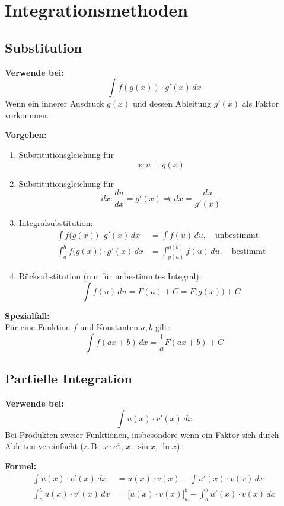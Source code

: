 \section{Integrationsmethoden}

\subsection{Substitution}
\textbf{Verwende bei:}
\[\int f(g(x))\cdot g'(x)\,dx\]
Wenn ein innerer Ausdruck \(g(x)\) und dessen Ableitung \(g'(x)\) als Faktor vorkommen.

\textbf{Vorgehen:}
\begin{enumerate}
    \item Substitutionsgleichung für
          \[
              x: u = g(x)
          \]
    \item Substitutionsgleichung für
          \[
              dx: \frac{du}{dx} = g'(x) \Rightarrow dx = \frac{du}{g'(x)}
          \]
    \item Integralsubstitution:
          \begin{align*}
              \int f\!\bigl(g(x)\bigr)\cdot g'(x)\,dx     & = \int f(u)\,du, \quad \text{unbestimmt}             \\
              \int_a^b f\!\bigl(g(x)\bigr)\cdot g'(x)\,dx & = \int_{g(a)}^{g(b)} f(u)\,du, \quad \text{bestimmt}
          \end{align*}
    \item  Rücksubstitution (nur für unbestimmtes Integral):
          \[
              \int f(u)\,du = F(u) + C = F\!\bigl(g(x)\bigr) + C
          \]

\end{enumerate}

\textbf{Spezialfall:}\\
Für eine Funktion \(f\) und Konstanten \(a, b\) gilt:
\[
    \int f(ax+b)\,dx = \frac{1}{a} F(ax+b) + C
\]

\subsection{Partielle Integration}
\textbf{Verwende bei:}
\[\int u(x)\cdot v'(x)\,dx\]
Bei Produkten zweier Funktionen, insbesondere wenn ein Faktor sich durch Ableiten vereinfacht (z.\,B.\ \(x\cdot e^x\), \(x\cdot\sin x\), \(\ln x\)).

\textbf{Formel:}
\begin{align*}
    \int u(x)\cdot v'(x)\,dx &= u(x)\cdot v(x) - \int u'(x)\cdot v(x)\,dx \\
    \int_a^b u(x)\cdot v'(x)\,dx &= \bigl[u(x)\cdot v(x)\bigr]_a^b - \int_a^b u'(x)\cdot v(x)\,dx
\end{align*}

